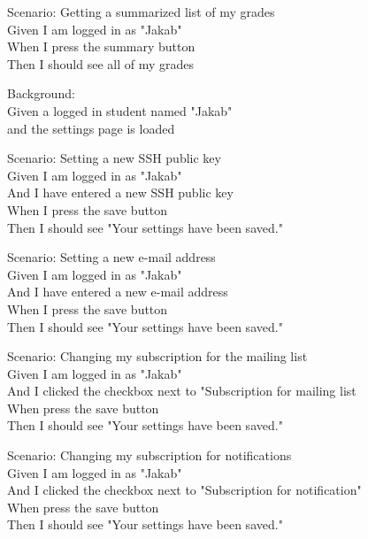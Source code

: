Scenario: Getting a summarized list of my grades\\ \hspace*{1cm}
Given I am logged in as "Jakab"\\ \hspace*{1cm}
When I press the summary button\\ \hspace*{1cm}
Then I should see all of my grades

Background:\\ \hspace*{1cm}
Given a logged in student named "Jakab"\\ \hspace*{1cm}
and the settings page is loaded

Scenario: Setting a new SSH public key\\ \hspace*{1cm}
Given I am logged in as "Jakab"\\ \hspace*{1cm}
And I have entered a new SSH public key\\ \hspace*{1cm}
When I press the save button\\ \hspace*{1cm}
Then I should see "Your settings have been saved."

Scenario: Setting a new e-mail address\\ \hspace*{1cm}
Given I am logged in as "Jakab"\\ \hspace*{1cm}
And I have entered a new e-mail address\\ \hspace*{1cm}
When I press the save button\\ \hspace*{1cm}
Then I should see "Your settings have been saved."

Scenario: Changing my subscription for the mailing list\\ \hspace*{1cm}
Given I am logged in as "Jakab"\\ \hspace*{1cm}
And I clicked the checkbox next to "Subscription for mailing list\\ \hspace*{1cm}
When press the save button\\ \hspace*{1cm}
Then I should see "Your settings have been saved."

Scenario: Changing my subscription for notifications\\ \hspace*{1cm}
Given I am logged in as "Jakab"\\ \hspace*{1cm}
And I clicked the checkbox next to "Subscription for notification"\\ \hspace*{1cm}
When press the save button\\ \hspace*{1cm}
Then I should see "Your settings have been saved."